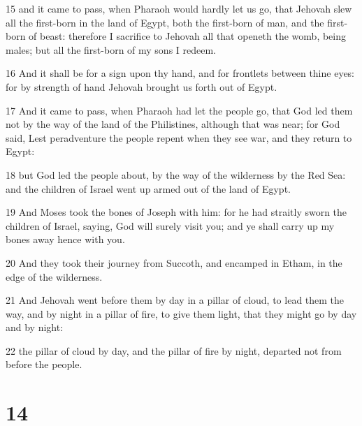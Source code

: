 \par 15 and it came to pass, when Pharaoh would hardly let us go, that Jehovah slew all the first-born in the land of Egypt, both the first-born of man, and the first-born of beast: therefore I sacrifice to Jehovah all that openeth the womb, being males; but all the first-born of my sons I redeem.
\par 16 And it shall be for a sign upon thy hand, and for frontlets between thine eyes: for by strength of hand Jehovah brought us forth out of Egypt.
\par 17 And it came to pass, when Pharaoh had let the people go, that God led them not by the way of the land of the Philistines, although that was near; for God said, Lest peradventure the people repent when they see war, and they return to Egypt:
\par 18 but God led the people about, by the way of the wilderness by the Red Sea: and the children of Israel went up armed out of the land of Egypt.
\par 19 And Moses took the bones of Joseph with him: for he had straitly sworn the children of Israel, saying, God will surely visit you; and ye shall carry up my bones away hence with you.
\par 20 And they took their journey from Succoth, and encamped in Etham, in the edge of the wilderness.
\par 21 And Jehovah went before them by day in a pillar of cloud, to lead them the way, and by night in a pillar of fire, to give them light, that they might go by day and by night:
\par 22 the pillar of cloud by day, and the pillar of fire by night, departed not from before the people.

\chapter{14}

